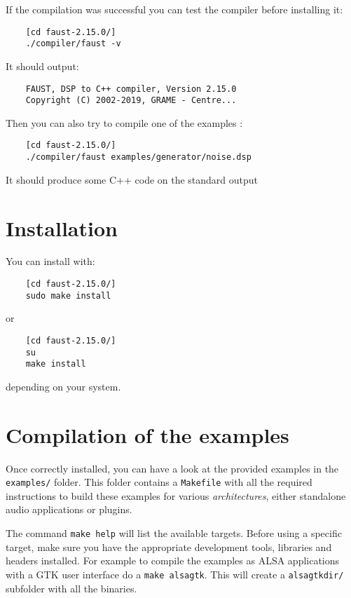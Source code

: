 If the compilation was successful you can test the compiler before installing it:
\begin{lstlisting}
	[cd faust-2.15.0/]
	./compiler/faust -v
\end{lstlisting}
It should output:
\begin{lstlisting}
	FAUST, DSP to C++ compiler, Version 2.15.0
	Copyright (C) 2002-2019, GRAME - Centre... 
\end{lstlisting}

Then you can also try to compile one of the examples :
\begin{lstlisting}
	[cd faust-2.15.0/]
	./compiler/faust examples/generator/noise.dsp
\end{lstlisting}
It should produce some C++ code on the standard output

\section{Installation}
You can install \faust with:
\begin{lstlisting}
	[cd faust-2.15.0/]
	sudo make install
\end{lstlisting}
or
\begin{lstlisting}
	[cd faust-2.15.0/]
	su
	make install
\end{lstlisting}
depending on your system.

\section{Compilation of the examples}
Once \faust correctly installed, you can have a look at the provided examples in the \lstinline'examples/' folder. This folder contains a  \lstinline'Makefile' with all the required instructions to build these examples for various \textit{architectures}, either standalone audio applications or plugins.

The command \lstinline'make help' will list the available targets. Before using a specific target, make sure you have the appropriate development tools, libraries and headers installed. For example to compile the examples as ALSA applications with a GTK user interface do a \lstinline'make alsagtk'. This will create a \lstinline'alsagtkdir/' subfolder with all the binaries. 

